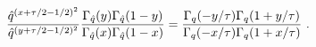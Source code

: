 \begin{equation}
\frac{\hat{q}^{(x+\tau /2-1/2)^{2}}}{\hat{q}^{(y+\tau /2-1/2)^{2}}}\frac{%
\Gamma _{\hat{q}}(y)\Gamma _{\hat{q}}(1-y)}{\Gamma _{\hat{q}}(x)\Gamma _{%
\hat{q}}(1-x)}=\frac{\Gamma _{q}(-y/\tau )\Gamma _{q}(1+y/\tau )}{\Gamma
_{q}(-x/\tau )\Gamma _{q}(1+x/\tau )}~.
\end{equation}%
